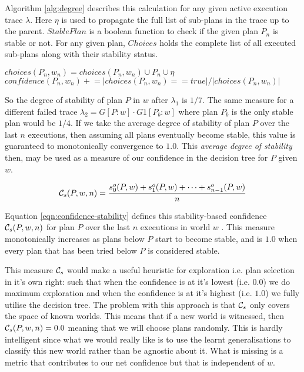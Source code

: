 
Algorithm \ref{alg:degree} describes this calculation for any given active execution trace $\lambda$. Here $\eta$ is used to propagate the full list of sub-plans in the trace up to the parent. $StablePlan$ is a boolean function to check if the given plan $P_n$ is stable or not. For any given plan, $Choices$ holds the complete list of all executed sub-plans along with their stability status.

\begin{algorithm}[ht]
$choices(P_n,w_n) = choices(P_n,w_n) \cup P_n \cup \eta$\;
$confidence(P_n,w_n) +\!\!= |choices(P_n,w_n) == true|/|choices(P_n,w_n)|$\;
\caption{$UpdateConfidence(\lambda, \eta, k, \epsilon)$}
\label{alg:degree}
\end{algorithm}

So the degree of stability of plan $P$ in $w$ after $\lambda_1$ is $1/7$. The same measure for a different failed trace $\lambda_2=G[P:w] \cdot G1[P_b:w]$ where plan $P_b$ is the only stable plan would be $1/4$. If we take the average degree of stability of plan $P$ over the last $n$ executions, then assuming all plans eventually become stable, this value is guaranteed to monotonically convergence to $1.0$. This {\em average degree of stability} then, may be used as a measure of our confidence in the decision tree for $P$ given $w$. 

\begin{equation}
{\ensuremath{\mathcal{C}}}_s(P,w,n) = \frac{s^o_0(P,w) + s^o_1(P,w) + \cdots + s^o_{n-1}(P,w)}{n}
\label{eqn:confidence-stability}
\end{equation}

Equation \ref{eqn:confidence-stability} defines this stability-based confidence ${\mathcal{C}}_s(P,w,n)$ for plan $P$ over the last $n$ executions in world $w$ . This measure monotonically increases as plans below $P$ start to become stable, and is $1.0$ when every plan that has been tried below $P$ is considered stable. 

This measure ${\mathcal{C}}_s$ would make a useful heuristic for exploration i.e. plan selection in it's own right: such that when the confidence is at it's lowest (i.e. $0.0$) we do maximum exploration and when the confidence is at it's highest (i.e. $1.0$) we fully utilise the decision tree. The problem with this approach is that ${\mathcal{C}}_s$ only covers the space of known worlds. This means that 
if a new world is witnessed, then ${\mathcal{C}}_s(P,w,n)=0.0$ meaning that we will choose plans randomly. This is hardly intelligent since what we would really like is to use the learnt generalisations to classify this new world rather than be agnostic about it. What is missing is a metric that contributes to our net confidence but that is independent of $w$.


